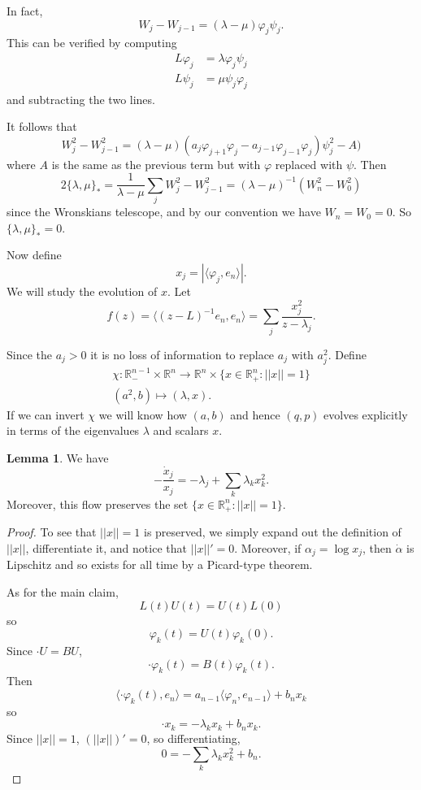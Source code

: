 \documentclass[12pt]{report}
\newcommand{\RR}{\mathbb{R}}
\theoremstyle{definition}
\newtheorem{lemma}[theorem]{Lemma}
\begin{document}
In fact,
$$W_j - W_{j-1} = (\lambda - \mu)\varphi_j\psi_j.$$
This can be verified by computing
\begin{align*}
L\varphi_j &= \lambda \varphi_j\psi_j\\
L\psi_j &= \mu \psi_j \varphi_j
\end{align*}
and subtracting the two lines.

It follows that
$$W_j^2 - W_{j-1}^2 = (\lambda - \mu)(a_j\varphi_{j+1}\varphi_j - a_{j-1}\varphi_{j-1}\varphi_j)\psi_j^2 - A)$$
where $A$ is the same as the previous term but with $\varphi$ replaced with $\psi$. Then
$$2\{\lambda, \mu\}_* = \frac{1}{\lambda - \mu}\sum_j W_j^2 - W_{j-1}^2 = (\lambda - \mu)^{-1}(W_n^2 - W_0^2)$$
since the Wronskians telescope, and by our convention we have $W_n = W_0 = 0$. So $\{\lambda, \mu\}_* = 0$.

Now define
$$x_j = |\langle \varphi_j, e_n\rangle|.$$
We will study the evolution of $x$. Let
$$f(z) = \langle (z - L)^{-1}e_n, e_n\rangle = \sum_j \frac{x_j^2}{z - \lambda_j}.$$

Since the $a_j > 0$ it is no loss of information to replace $a_j$ with $a_j^2$. Define
\begin{align*}
\chi: \RR^{n-1}_- \times \RR^n \to \RR^n \times \{x \in \RR^n_+: ||x|| = 1\}\\
(a^2, b) \mapsto (\lambda, x).
\end{align*}
If we can invert $\chi$ we will know how $(a, b)$ and hence $(q, p)$ evolves explicitly in terms of the eigenvalues $\lambda$ and scalars $x$.

\begin{lemma}
We have
$$-\frac{\dot x_j}{x_j} = -\lambda_j + \sum_k \lambda_kx_k^2.$$
Moreover, this flow preserves the set $\{x \in \RR^n_+: ||x|| = 1\}$.
\end{lemma}
\begin{proof}
To see that $||x|| = 1$ is preserved, we simply expand out the definition of $||x||$, differentiate it, and notice that $||x||' = 0.$
Moreover, if $\alpha_j = \log x_j$, then $\dot \alpha$ is Lipschitz and so exists for all time by a Picard-type theorem.

As for the main claim,
$$L(t)U(t) = U(t)L(0)$$
so
$$\varphi_k(t) = U(t) \varphi_k(0).$$
Since $\cdot U = BU$,
$$\cdot \varphi_k(t) = B(t)\varphi_k(t).$$
Then
$$\langle \cdot \varphi_k(t), e_n\rangle = a_{n-1}\langle \varphi_n, e_{n-1}\rangle + b_n x_k$$
so
$$\cdot x_k = - \lambda_k x_k + b_n x_k.$$
Since $||x|| = 1$, $(||x||)' = 0$, so differentiating,
$$0 = -\sum_k \lambda_k x_k^2 + b_n.$$
\end{proof}
\end{document}
